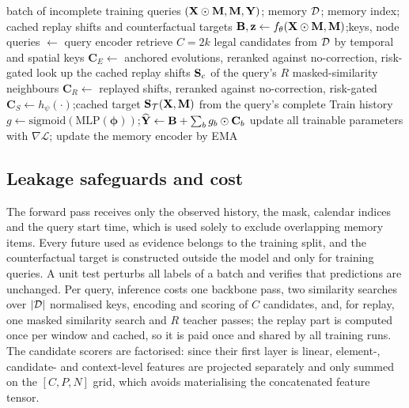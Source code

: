 \begin{algorithm}[t]
\caption{One ReShift training step}
\label{alg:train}
\begin{algorithmic}[1]
\REQUIRE batch of incomplete training queries $(\mathbf{X}\odot\mathbf{M},\mathbf{M},\mathbf{Y})$; memory $\mathcal{D}$; memory index; cached replay shifts and counterfactual targets
\STATE $\mathbf{B},\mathbf{z}\leftarrow f_\theta(\mathbf{X}\odot\mathbf{M},\mathbf{M})$;\quad keys, node queries $\leftarrow$ query encoder
\STATE retrieve $C=2k$ legal candidates from $\mathcal{D}$ by temporal and spatial keys
\STATE $\mathbf{C}_E\leftarrow$ anchored evolutions, reranked against no-correction, risk-gated
\STATE look up the cached replay shifts $\mathbf{S}_c$ of the query's $R$ masked-similarity neighbours
\STATE $\mathbf{C}_R\leftarrow$ replayed shifts, reranked against no-correction, risk-gated
\STATE $\mathbf{C}_S\leftarrow h_\psi(\cdot)$;\quad cached target $\mathbf{S}_{\mathcal{T}}(\mathbf{X},\mathbf{M})$ from the query's complete Train history
\STATE $g\leftarrow\mathrm{sigmoid}(\mathrm{MLP}(\bm\phi))$;\quad $\widehat{\mathbf{Y}}\leftarrow\mathbf{B}+\sum_b g_b\odot\mathbf{C}_b$
\STATE update all trainable parameters with $\nabla\mathcal{L}$; update the memory encoder by EMA
\end{algorithmic}
\end{algorithm}

\subsection{Leakage safeguards and cost}
\label{sec:leakage}
The forward pass receives only the observed history, the mask, calendar indices and the query start time, which is used solely to exclude overlapping memory items. Every future used as evidence belongs to the training split, and the counterfactual target is constructed outside the model and only for training queries. A unit test perturbs all labels of a batch and verifies that predictions are unchanged. Per query, inference costs one backbone pass, two similarity searches over $|\mathcal{D}|$ normalised keys, encoding and scoring of $C$ candidates, and, for replay, one masked similarity search and $R$ teacher passes; the replay part is computed once per window and cached, so it is paid once and shared by all training runs. The candidate scorers are factorised: since their first layer is linear, element-, candidate- and context-level features are projected separately and only summed on the $[C,P,N]$ grid, which avoids materialising the concatenated feature tensor. 
